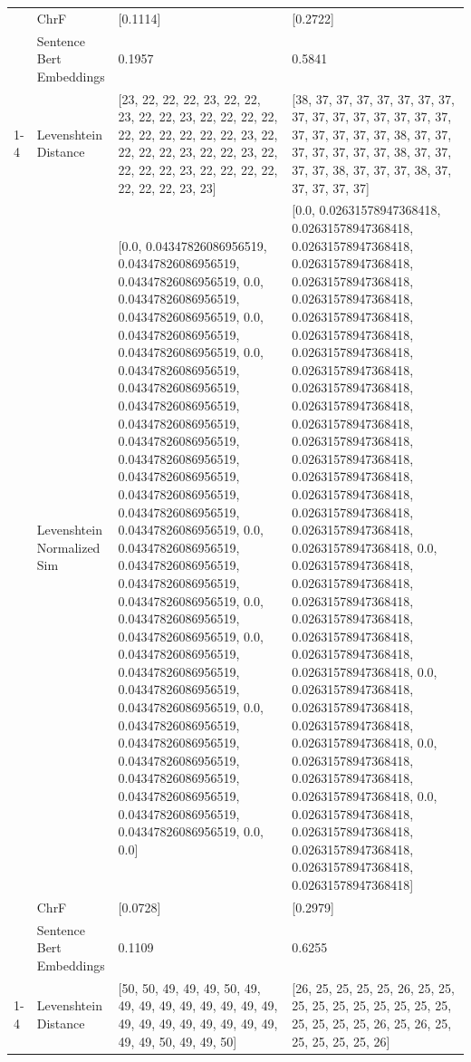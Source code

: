 \begin{tabular}{llll}
 & ChrF & [0.1114] & [0.2722] \\
 & Sentence Bert Embeddings & 0.1957 & 0.5841 \\
\cline{1-4}
\multirow[t]{4}{*}{Gitoi kimenyaga kierwo} & Levenshtein Distance & [23, 22, 22, 22, 23, 22, 22, 23, 22, 22, 23, 22, 22, 22, 22, 22, 22, 22, 22, 22, 22, 23, 22, 22, 22, 22, 23, 22, 22, 23, 22, 22, 22, 22, 23, 22, 22, 22, 22, 22, 22, 22, 23, 23] & [38, 37, 37, 37, 37, 37, 37, 37, 37, 37, 37, 37, 37, 37, 37, 37, 37, 37, 37, 37, 37, 38, 37, 37, 37, 37, 37, 37, 37, 38, 37, 37, 37, 37, 38, 37, 37, 37, 38, 37, 37, 37, 37, 37] \\
 & Levenshtein Normalized Sim & [0.0, 0.04347826086956519, 0.04347826086956519, 0.04347826086956519, 0.0, 0.04347826086956519, 0.04347826086956519, 0.0, 0.04347826086956519, 0.04347826086956519, 0.0, 0.04347826086956519, 0.04347826086956519, 0.04347826086956519, 0.04347826086956519, 0.04347826086956519, 0.04347826086956519, 0.04347826086956519, 0.04347826086956519, 0.04347826086956519, 0.04347826086956519, 0.0, 0.04347826086956519, 0.04347826086956519, 0.04347826086956519, 0.04347826086956519, 0.0, 0.04347826086956519, 0.04347826086956519, 0.0, 0.04347826086956519, 0.04347826086956519, 0.04347826086956519, 0.04347826086956519, 0.0, 0.04347826086956519, 0.04347826086956519, 0.04347826086956519, 0.04347826086956519, 0.04347826086956519, 0.04347826086956519, 0.04347826086956519, 0.0, 0.0] & [0.0, 0.02631578947368418, 0.02631578947368418, 0.02631578947368418, 0.02631578947368418, 0.02631578947368418, 0.02631578947368418, 0.02631578947368418, 0.02631578947368418, 0.02631578947368418, 0.02631578947368418, 0.02631578947368418, 0.02631578947368418, 0.02631578947368418, 0.02631578947368418, 0.02631578947368418, 0.02631578947368418, 0.02631578947368418, 0.02631578947368418, 0.02631578947368418, 0.02631578947368418, 0.0, 0.02631578947368418, 0.02631578947368418, 0.02631578947368418, 0.02631578947368418, 0.02631578947368418, 0.02631578947368418, 0.02631578947368418, 0.0, 0.02631578947368418, 0.02631578947368418, 0.02631578947368418, 0.02631578947368418, 0.0, 0.02631578947368418, 0.02631578947368418, 0.02631578947368418, 0.0, 0.02631578947368418, 0.02631578947368418, 0.02631578947368418, 0.02631578947368418, 0.02631578947368418] \\
 & ChrF & [0.0728] & [0.2979] \\
 & Sentence Bert Embeddings & 0.1109 & 0.6255 \\
\cline{1-4}
\multirow[t]{4}{*}{Kihooto ni indo} & Levenshtein Distance & [50, 50, 49, 49, 49, 50, 49, 49, 49, 49, 49, 49, 49, 49, 49, 49, 49, 49, 49, 49, 49, 49, 49, 49, 49, 50, 49, 49, 50] & [26, 25, 25, 25, 25, 26, 25, 25, 25, 25, 25, 25, 25, 25, 25, 25, 25, 25, 25, 25, 26, 25, 26, 25, 25, 25, 25, 25, 26] \\

\end{tabular}
